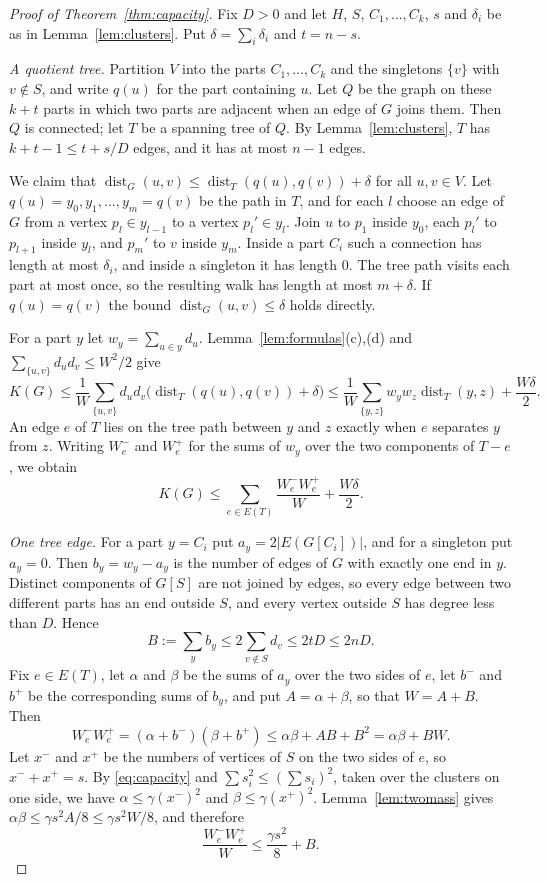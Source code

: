 \documentclass[11pt]{amsart}
\numberwithin{equation}{section}
\theoremstyle{remark}
\newcommand{\dist}{\operatorname{dist}}
\begin{document}
\begin{proof}[Proof of Theorem~\ref{thm:capacity}]
Fix $D>0$ and let $H$, $S$, $C_1,\dots,C_k$, $s$ and $\delta_i$ be as in Lemma~\ref{lem:clusters}. Put $\delta=\sum_i\delta_i$ and $t=n-s$.

\emph{A quotient tree.} Partition $V$ into the parts $C_1,\dots,C_k$ and the singletons $\{v\}$ with $v\notin S$, and write $q(u)$ for the part containing $u$. Let $Q$ be the graph on these $k+t$ parts in which two parts are adjacent when an edge of $G$ joins them. Then $Q$ is connected; let $T$ be a spanning tree of $Q$. By Lemma~\ref{lem:clusters}, $T$ has $k+t-1\le t+s/D$ edges, and it has at most $n-1$ edges.

We claim that $\dist_G(u,v)\le\dist_T(q(u),q(v))+\delta$ for all $u,v\in V$. Let $q(u)=y_0,y_1,\dots,y_m=q(v)$ be the path in $T$, and for each $l$ choose an edge of $G$ from a vertex $p_l\in y_{l-1}$ to a vertex $p_l'\in y_l$. Join $u$ to $p_1$ inside $y_0$, each $p_l'$ to $p_{l+1}$ inside $y_l$, and $p_m'$ to $v$ inside $y_m$. Inside a part $C_i$ such a connection has length at most $\delta_i$, and inside a singleton it has length $0$. The tree path visits each part at most once, so the resulting walk has length at most $m+\delta$. If $q(u)=q(v)$ the bound $\dist_G(u,v)\le\delta$ holds directly.

For a part $y$ let $w_y=\sum_{u\in y}d_u$. Lemma~\ref{lem:formulas}(c),(d) and $\sum_{\{u,v\}}d_ud_v\le W^2/2$ give
\[
K(G)\le\frac1W\sum_{\{u,v\}}d_ud_v\bigl(\dist_T(q(u),q(v))+\delta\bigr)\le\frac1W\sum_{\{y,z\}}w_yw_z\dist_T(y,z)+\frac{W\delta}2 .
\]
An edge $e$ of $T$ lies on the tree path between $y$ and $z$ exactly when $e$ separates $y$ from $z$. Writing $W_e^-$ and $W_e^+$ for the sums of $w_y$ over the two components of $T-e$, we obtain
\begin{equation}\label{eq:treesum}
K(G)\le\sum_{e\in E(T)}\frac{W_e^-W_e^+}{W}+\frac{W\delta}2 .
\end{equation}

\emph{One tree edge.} For a part $y=C_i$ put $a_y=2|E(G[C_i])|$, and for a singleton put $a_y=0$. Then $b_y=w_y-a_y$ is the number of edges of $G$ with exactly one end in $y$. Distinct components of $G[S]$ are not joined by edges, so every edge between two different parts has an end outside $S$, and every vertex outside $S$ has degree less than $D$. Hence
\[
B:=\sum_yb_y\le2\sum_{v\notin S}d_v\le2tD\le2nD .
\]
Fix $e\in E(T)$, let $\alpha$ and $\beta$ be the sums of $a_y$ over the two sides of $e$, let $b^-$ and $b^+$ be the corresponding sums of $b_y$, and put $A=\alpha+\beta$, so that $W=A+B$. Then
\[
W_e^-W_e^+=(\alpha+b^-)(\beta+b^+)\le\alpha\beta+AB+B^2=\alpha\beta+BW .
\]
Let $x^-$ and $x^+$ be the numbers of vertices of $S$ on the two sides of $e$, so $x^-+x^+=s$. By \eqref{eq:capacity} and $\sum s_i^2\le(\sum s_i)^2$, taken over the clusters on one side, we have $\alpha\le\gamma(x^-)^2$ and $\beta\le\gamma(x^+)^2$. Lemma~\ref{lem:twomass} gives $\alpha\beta\le\gamma s^2A/8\le\gamma s^2W/8$, and therefore
\[
\frac{W_e^-W_e^+}W\le\frac{\gamma s^2}8+B .
\]


\end{proof}
\end{document}
